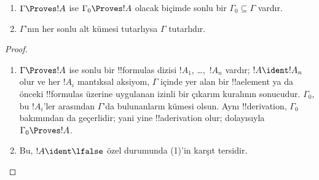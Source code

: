 \begin{prop}[Kompaktlık]
  \begin{enumerate}
  \item $\Gamma \Proves !A$ ise $\Gamma_0 \Proves !A$ olacak biçimde sonlu
    bir $\Gamma_0 \subseteq \Gamma$ vardır.
  \item $\Gamma$'nın her sonlu alt kümesi tutarlıysa $\Gamma$ tutarlıdır.
  \end{enumerate}
\end{prop}

\begin{proof}
  \begin{enumerate}
    \item $\Gamma \Proves !A$ ise sonlu bir !!{formula}s dizisi
      $!A_1$, \dots,~$!A_n$ vardır; $!A \ident !A_n$ olur ve her $!A_i$
      mantıksal aksiyom, $\Gamma$ içinde yer alan bir !!a{element} ya da
      önceki !!{formula}s üzerine uygulanan izinli bir çıkarım kuralının
      sonucudur.
      $\Gamma_0$, bu $!A_i$'ler arasından $\Gamma$'da bulunanların kümesi
      olsun. Aynı !!{derivation}, $\Gamma_0$ bakımından da geçerlidir; yani
      yine !!a{derivation} olur;
      dolayısıyla $\Gamma_0 \Proves !A$.
    \item Bu, $!A \ident \lfalse$ özel durumunda (1)'in karşıt tersidir.
  \end{enumerate}
\end{proof}

